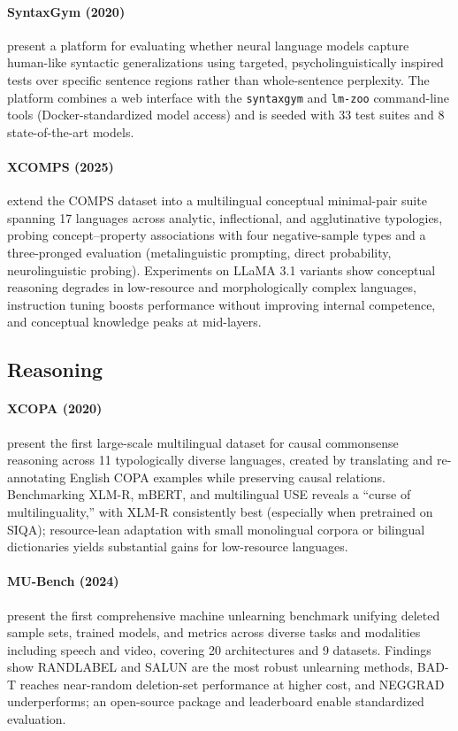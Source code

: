\documentclass[letterpaper]{article}
\begin{document}
\paragraph{SyntaxGym (2020)} \citet{gauthier2020syntaxgym} present a platform for evaluating whether neural language models capture human-like syntactic generalizations using targeted, psycholinguistically inspired tests over specific sentence regions rather than whole-sentence perplexity. The platform combines a web interface with the \texttt{syntaxgym} and \texttt{lm-zoo} command-line tools (Docker-standardized model access) and is seeded with 33 test suites and 8 state-of-the-art models.

\paragraph{XCOMPS (2025)} \citet{he2025xcomps} extend the COMPS dataset into a multilingual conceptual minimal-pair suite spanning 17 languages across analytic, inflectional, and agglutinative typologies, probing concept--property associations with four negative-sample types and a three-pronged evaluation (metalinguistic prompting, direct probability, neurolinguistic probing). Experiments on LLaMA 3.1 variants show conceptual reasoning degrades in low-resource and morphologically complex languages, instruction tuning boosts performance without improving internal competence, and conceptual knowledge peaks at mid-layers.

\subsection{Reasoning}

\paragraph{XCOPA (2020)} \citet{ponti-etal-2020-xcopa} present the first large-scale multilingual dataset for causal commonsense reasoning across 11 typologically diverse languages, created by translating and re-annotating English COPA examples while preserving causal relations. Benchmarking XLM-R, mBERT, and multilingual USE reveals a ``curse of multilinguality,'' with XLM-R consistently best (especially when pretrained on SIQA); resource-lean adaptation with small monolingual corpora or bilingual dictionaries yields substantial gains for low-resource languages.

\paragraph{MU-Bench (2024)} \citet{cheng2024mubenchmultitaskmultimodalbenchmark} present the first comprehensive machine unlearning benchmark unifying deleted sample sets, trained models, and metrics across diverse tasks and modalities including speech and video, covering 20 architectures and 9 datasets. Findings show RANDLABEL and SALUN are the most robust unlearning methods, BAD-T reaches near-random deletion-set performance at higher cost, and NEGGRAD underperforms; an open-source package and leaderboard enable standardized evaluation.
\end{document}
